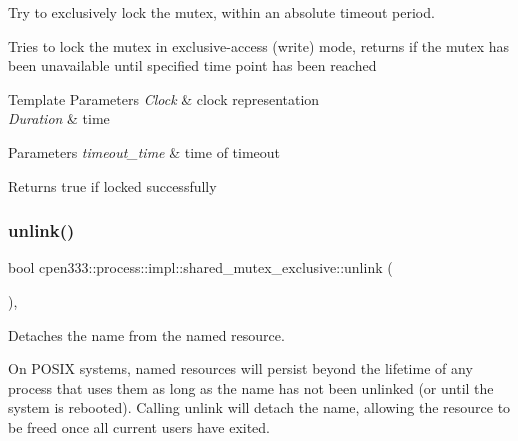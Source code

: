 Try to exclusively lock the mutex, within an absolute timeout period. 

Tries to lock the mutex in exclusive-\/access (write) mode, returns if the mutex has been unavailable until specified time point has been reached


\begin{DoxyTemplParams}{Template Parameters}
{\em Clock} & clock representation \\
\hline
{\em Duration} & time \\
\hline
\end{DoxyTemplParams}

\begin{DoxyParams}{Parameters}
{\em timeout\+\_\+time} & time of timeout \\
\hline
\end{DoxyParams}
\begin{DoxyReturn}{Returns}
true if locked successfully 
\end{DoxyReturn}
\mbox{\label{classcpen333_1_1process_1_1impl_1_1shared__mutex__exclusive_ad296e92049cc48cc3c40ec7404bf836c}} 
\subsubsection{\texorpdfstring{unlink()}{unlink()}\hspace{0.1cm}{\footnotesize\ttfamily [1/2]}}
{\footnotesize\ttfamily bool cpen333\+::process\+::impl\+::shared\+\_\+mutex\+\_\+exclusive\+::unlink (\begin{DoxyParamCaption}{ }\end{DoxyParamCaption})\hspace{0.3cm}{\ttfamily [inline]}, {\ttfamily [virtual]}}



Detaches the name from the named resource. 

On P\+O\+S\+IX systems, named resources will persist beyond the lifetime of any process that uses them as long as the name has not been unlinked (or until the system is rebooted). Calling {\ttfamily unlink} will detach the name, allowing the resource to be freed once all current users have exited.

